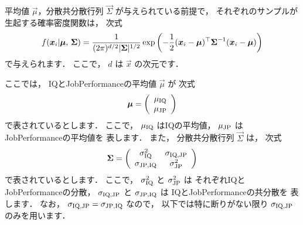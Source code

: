 \documentclass[a4j]{jarticle}\usepackage[]{graphicx}\usepackage[]{color}
\begin{document}
平均値 $\vec{\mu}$，分散共分散行列 $\vec{\Sigma}$ が与えられている前提で，
それぞれのサンプルが生起する確率密度関数は，
次式
\begin{equation}
f(\mbox{\boldmath $x$}_{i} | \mbox{\boldmath $\mu$}, \, \mbox{\boldmath $\Sigma$}) = 
  \frac{1}{(2\pi)^{d/2} |\mbox{\boldmath $\Sigma$}|^{1/2}} 
  \exp{\left(
         -\frac{1}{2}
            (\mbox{\boldmath $x$}_{i} - \mbox{\boldmath $\mu$})^{\top}
            \mbox{\boldmath $\Sigma$}^{-1}
            (\mbox{\boldmath $x$}_{i} - \mbox{\boldmath $\mu$})
       \right)
  }
\end{equation}
で与えられます．
ここで，
$d$ は $\vec{x}$ の次元です．

ここでは，
IQとJobPerformanceの平均値 $\vec{\mu}$ が
次式
\begin{equation}
\mbox{\boldmath $\mu$} = 
  \left(
		\begin{array}{c}
		  \mu_{\mathrm{IQ}} \\
      \mu_{\mathrm{JP}}
    \end{array}
  \right)
\end{equation}
で表されているとします．
ここで，
$\mu_{\mathrm{IQ}}$ はIQの平均値，
$\mu_{\mathrm{JP}}$ はJobPerformanceの平均値を
表します．
また，
分散共分散行列 $\vec{\Sigma}$ は，
次式
\begin{equation}
\mbox{\boldmath $\Sigma$} = 
  \left(
    \begin{array}{cc}
     \sigma_{\mathrm{IQ}}^2 & \sigma_{\mathrm{IQ}, \mathrm{JP}} \\
     \sigma_{\mathrm{JP}, \mathrm{IQ}} & \sigma_{\mathrm{JP}}^2
    \end{array}
  \right)
\end{equation}
で表されているとします．
ここで，
$\sigma_{\mathrm{IQ}}^2$ と $\sigma_{\mathrm{JP}}^2$ は
それぞれIQとJobPerformanceの分散，
$\sigma_{\mathrm{IQ}, \mathrm{JP}}$ と $\sigma_{\mathrm{JP}, \mathrm{IQ}}$ は
IQとJobPerformanceの共分散を
表します．
なお，
$\sigma_{\mathrm{IQ}, \mathrm{JP}} = \sigma_{\mathrm{JP}, \mathrm{IQ}}$ なので，
以下では特に断りがない限り $\sigma_{\mathrm{IQ}, \mathrm{JP}}$ のみを用います．
\end{document}
